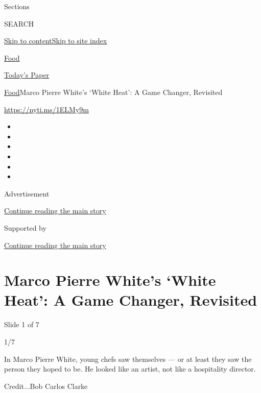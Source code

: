 Sections

SEARCH

\protect\hyperlink{site-content}{Skip to
content}\protect\hyperlink{site-index}{Skip to site index}

\href{https://www.nytimes3xbfgragh.onion/section/food}{Food}

\href{https://myaccount.nytimes3xbfgragh.onion/auth/login?response_type=cookie\&client_id=vi}{}

\href{https://www.nytimes3xbfgragh.onion/section/todayspaper}{Today's
Paper}

\href{/section/food}{Food}\textbar{}Marco Pierre White's `White Heat': A
Game Changer, Revisited

\url{https://nyti.ms/1ELMy9m}

\begin{itemize}
\item
\item
\item
\item
\item
\item
\end{itemize}

Advertisement

\protect\hyperlink{after-top}{Continue reading the main story}

Supported by

\protect\hyperlink{after-sponsor}{Continue reading the main story}

\hypertarget{marco-pierre-whites-white-heat-a-game-changer-revisited}{%
\section{Marco Pierre White's `White Heat': A Game Changer,
Revisited}\label{marco-pierre-whites-white-heat-a-game-changer-revisited}}

Slide 1 of 7

1/7

In Marco Pierre White, young chefs saw themselves --- or at least they
saw the person they hoped to be. He looked like an artist, not like a
hospitality director.

Credit...Bob Carlos Clarke

